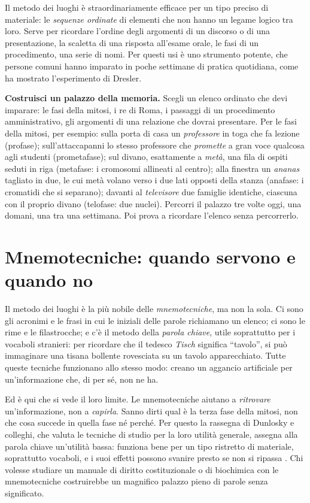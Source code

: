 Il metodo dei luoghi è straordinariamente efficace per un tipo preciso
di materiale: le \emph{sequenze ordinate} di elementi che non hanno un
legame logico tra loro. Serve per ricordare l'ordine degli argomenti di
un discorso o di una presentazione, la scaletta di una risposta
all'esame orale, le fasi di un procedimento, una serie di nomi. Per
questi usi è uno strumento potente, che persone comuni hanno imparato in poche settimane di pratica quotidiana, come ha mostrato l'esperimento di Dresler.

\begin{esercizio}
\textbf{Costruisci un palazzo della memoria.} Scegli un elenco ordinato
che devi imparare: le fasi della mitosi, i re di Roma, i passaggi di un
procedimento amministrativo, gli argomenti di una relazione che dovrai
presentare. Per le fasi della mitosi, per esempio: sulla porta di casa
un \emph{professore} in toga che fa lezione (profase); sull'attaccapanni
lo stesso professore che \emph{promette} a gran voce qualcosa agli
studenti (prometafase); sul divano, esattamente a \emph{metà}, una fila
di ospiti seduti in riga (metafase: i cromosomi allineati al centro);
alla finestra un \emph{ananas} tagliato in due, le cui metà volano
verso i due lati opposti della stanza (anafase: i cromatidi che si
separano); davanti al \emph{televisore} due famiglie identiche, ciascuna
con il proprio divano (telofase: due nuclei). Percorri il palazzo tre volte
oggi, una domani, una tra una settimana. Poi prova a ricordare
l'elenco senza percorrerlo.
\end{esercizio}

\section{Mnemotecniche: quando servono e quando no}

Il metodo dei luoghi è la più nobile delle \emph{mnemotecniche}, ma non
la sola. Ci sono gli acronimi e le frasi in cui le iniziali delle parole
richiamano un elenco; ci sono le rime e le filastrocche; e c'è il
metodo della \emph{parola chiave}, utile soprattutto per i vocaboli
stranieri: per ricordare che il tedesco \emph{Tisch} significa
\enquote{tavolo}, si può immaginare una tisana bollente rovesciata su un
tavolo apparecchiato. Tutte queste tecniche funzionano
allo stesso modo: creano un aggancio artificiale per un'informazione
che, di per sé, non ne ha.

Ed è qui che si vede il loro limite. Le mnemotecniche aiutano a
\emph{ritrovare} un'informazione, non a \emph{capirla}. Sanno dirti
qual è la terza fase della mitosi, non che cosa succede in quella fase
né perché. Per questo la rassegna di Dunlosky e colleghi, che valuta le
tecniche di studio per la loro utilità generale, assegna alla parola
chiave un'utilità bassa: funziona bene per un tipo ristretto di
materiale, soprattutto vocaboli, e i suoi effetti possono svanire presto
se non si ripassa \parencite{dunlosky2013}. Chi volesse studiare un
manuale di diritto costituzionale o di biochimica con le mnemotecniche
costruirebbe un magnifico palazzo pieno di parole senza significato.

